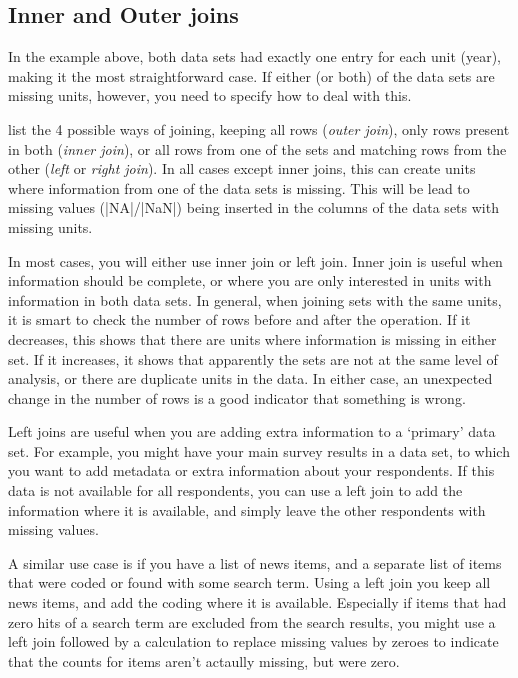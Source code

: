 \subsection{Inner and Outer joins}

In the example above, both data sets had exactly one entry for each unit (year), making it the most straightforward case.
If either (or both) of the data sets are missing units, however, you need to specify how to deal with this.

 list the 4 possible ways of joining, keeping all rows (\emph{outer join}), only rows present in both (\emph{inner join}), or all rows from one of the sets and matching rows from the other (\emph{left} or \emph{right join}).
In all cases except inner joins, this can create units where information from one of the data sets is missing.
This will be lead to missing values (|NA|/|NaN|) being inserted in the columns of the data sets with missing units.



In most cases, you will either use inner join or left join.
Inner join is useful when information should be complete,
or where you are only interested in units with information in both data sets.
In general, when joining sets with the same units, it is smart to check the number of rows before and after the operation.
If it decreases, this shows that there are units where information is missing in either set.
If it increases, it shows that apparently the sets are not at the same level of analysis,
or there are duplicate units in the data.
In either case, an unexpected change in the number of rows is a good indicator that something is wrong.

Left joins are useful when you are adding extra information to a `primary' data set.
For example, you might have your main survey results in a data set,
to which you want to add metadata or extra information about your respondents.
If this data is not available for all respondents, you can use a left join to add the information
where it is available, and simply leave the other respondents with missing values.

A similar use case is if you have a list of news items, and a separate list of items that were coded
or found with some search term. Using a left join you keep all news items, and add the coding where it is available.
Especially if items that had zero hits of a search term are excluded from the search results,
you might use a left join followed by a calculation to replace missing values by zeroes to indicate that the counts for
items aren't actaully missing, but were zero. 

